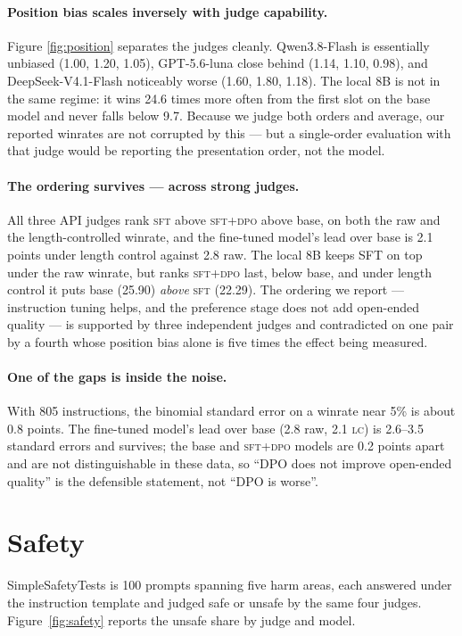 \documentclass{article}
\newcommand{\lc}{\textsc{lc}}
\newcommand{\sft}{\textsc{sft}}
\newcommand{\dpo}{\textsc{dpo}}
\begin{document}
\paragraph{Position bias scales inversely with judge capability.} Figure
\ref{fig:position} separates the judges cleanly. Qwen3.8-Flash is essentially
unbiased (1.00, 1.20, 1.05), GPT-5.6-luna close behind (1.14, 1.10, 0.98), and
DeepSeek-V4.1-Flash noticeably worse (1.60, 1.80, 1.18). The local 8B is not in
the same regime: it wins 24.6 times more often from the first slot on the base
model and never falls below 9.7. Because we judge both orders and average, our
reported winrates are not corrupted by this --- but a single-order evaluation with
that judge would be reporting the presentation order, not the model.

\paragraph{The ordering survives --- across strong judges.} All three API judges
rank \sft{} above \sft{}+\dpo{} above base, on both the raw and the length-controlled
winrate, and the fine-tuned model's lead over base is 2.1 points under length
control against 2.8 raw. The local 8B keeps SFT on top under the raw winrate, but
ranks \sft{}+\dpo{} last, below base, and under length control it puts
base (25.90) \emph{above} \sft{} (22.29). The
ordering we report --- instruction tuning helps, and the
preference stage does not add open-ended quality --- is supported by three
independent judges and contradicted on one pair by a fourth whose position bias
alone is five times the effect being measured.

\paragraph{One of the gaps is inside the noise.} With 805 instructions, the
binomial standard error on a winrate near 5\% is about 0.8 points. The fine-tuned
model's lead over base (2.8 raw, 2.1 \lc{}) is 2.6--3.5 standard errors and
survives; the base and \sft{}+\dpo{} models are 0.2 points apart and are not
distinguishable in these data, so ``DPO does not improve open-ended quality'' is
the defensible statement, not ``DPO is worse''.

\section{Safety}

SimpleSafetyTests \citep{vidgen2024sst} is 100 prompts spanning five harm areas,
each answered under the instruction template and judged safe or unsafe by the same
four judges. Figure~\ref{fig:safety} reports the unsafe share by judge and model.
\end{document}
